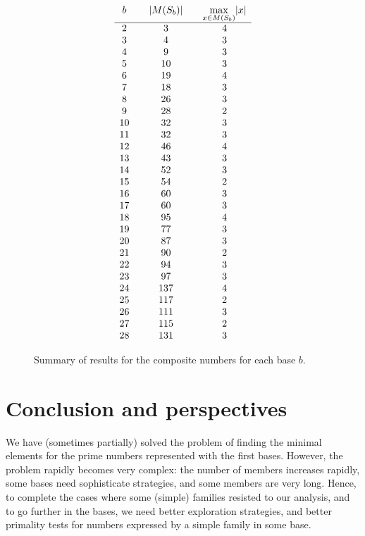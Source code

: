 \documentclass[12pt]{article}
\theoremstyle{plain}
\theoremstyle{definition}
\theoremstyle{remark}
\newcommand{\0}{\mathtt{0}}
\newcommand{\1}{\mathtt{1}}
\newcommand{\2}{\mathtt{2}}
\newcommand{\3}{\mathtt{3}}
\newcommand{\4}{\mathtt{4}}
\newcommand{\5}{\mathtt{5}}
\newcommand{\6}{\mathtt{6}}
\newcommand{\7}{\mathtt{7}}
\newcommand{\8}{\mathtt{8}}
\newcommand{\9}{\mathtt{9}}
\begin{document}
\begin{figure}\[\begin{array}{c@{\qquad}c@{\qquad}c}
b & \lvert M(S_b)\rvert & \max\limits_{x\in M(S_b)}\lvert x\rvert \\ \hline
2 & 3 & 4 \\
3 & 4 & 3 \\
4 & 9 & 3 \\
5 & 10 & 3 \\
6 & 19 & 4 \\
7 & 18 & 3\\
8 & 26 & 3 \\
9 & 28 & 2 \\
10 & 32 & 3 \\
11 & 32 & 3\\
12 & 46 & 4 \\
13 & 43 & 3 \\
14 & 52 & 3 \\
15 & 54 & 2 \\
16 & 60 & 3 \\
17 & 60 & 3 \\
18 & 95 & 4 \\
19 & 77 & 3 \\
20 & 87 & 3 \\
21 & 90 & 2 \\
22 & 94 & 3 \\
23 & 97 & 3 \\
24 & 137 & 4 \\
25 & 117 & 2 \\
26 & 111 & 3 \\
27 & 115 & 2 \\
28 & 131 & 3
\end{array}\]
\caption{Summary of results for the composite numbers for each base $b$.}
\label{ttwo}
\end{figure}

\section{Conclusion and perspectives}

We have (sometimes partially) solved the problem of finding the minimal elements for the prime numbers
represented with the first bases. However, the problem rapidly becomes very complex: the number of members
increases rapidly, some bases need sophisticate strategies, and some members are very long.
Hence, to complete the cases where some (simple) families resisted to our analysis, and to go further in the bases,
we need better exploration strategies, and better primality tests for numbers expressed by a simple family in some base.
\end{document}
